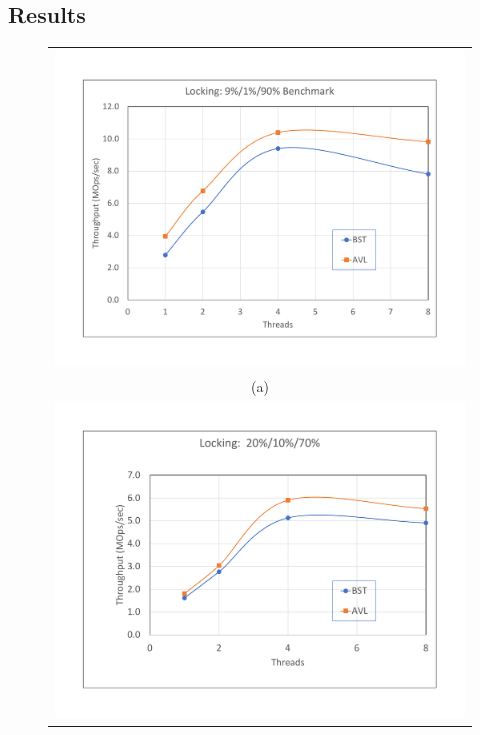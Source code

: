 \documentclass[conference]{IEEEtran}
\begin{document}
\subsection{Results}

\begin{figure}[H]
\begin{tabular}{c}
\includegraphics[width =\linewidth]{figures/conc-9-1-90}\\
(a) \\
\includegraphics[width =\linewidth]{figures/conc-20-10-70}\\

\end{tabular}
\end{figure}
\end{document}
